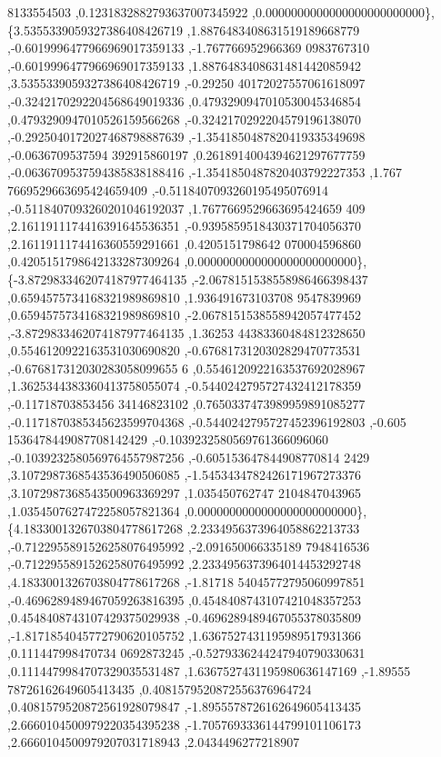 \begin{DoxyCode}
      8133554503 ,0.1231832882793637007345922 ,0.0000000000000000000000000\},
\{3.5355339059327386408426719 ,1.8876483408631519189668779 ,-0.6019996477966969017359133 ,-1.767766952966369
      0983767310 ,-0.6019996477966969017359133 ,1.8876483408631481442085942 ,3.5355339059327386408426719 ,-0.29250
      40172027557061618097 ,-0.3242170292204568649019336 ,0.4793290947010530045346854 ,0.4793290947010526159566268
       ,-0.3242170292204579196138070 ,-0.2925040172027468798887639 ,-1.3541850487820419335349698 ,-0.0636709537594
      392915860197 ,0.2618914004394621297677759 ,-0.0636709537594385838188416 ,-1.3541850487820403792227353 ,1.767
      7669529663695424659409 ,-0.5118407093260195495076914 ,-0.5118407093260201046192037 ,1.7677669529663695424659
      409 ,2.1611911174416391645536351 ,-0.9395859518430371704056370 ,2.1611911174416360559291661 ,0.4205151798642
      070004596860 ,0.4205151798642133287309264 ,0.0000000000000000000000000\},
\{-3.8729833462074187977464135 ,-2.0678151538558986466398437 ,0.6594575734168321989869810 ,1.936491673103708
      9547839969 ,0.6594575734168321989869810 ,-2.0678151538558942057477452 ,-3.8729833462074187977464135 ,1.36253
      44383360484812328650 ,0.5546120922163531030690820 ,-0.6768173120302829470773531 ,-0.676817312030283058099655
      6 ,0.5546120922163537692028967 ,1.3625344383360413758055074 ,-0.5440242795727432412178359 ,-0.11718703853456
      34146823102 ,0.7650337473989959891085277 ,-0.1171870385345623599704368 ,-0.5440242795727452396192803 ,-0.605
      1536478449087708142429 ,-0.1039232580569761366096060 ,-0.1039232580569764557987256 ,-0.605153647844908770814
      2429 ,3.1072987368543536490506085 ,-1.5453434782426171967273376 ,3.1072987368543500963369297 ,1.035450762747
      2104847043965 ,1.0354507627472258057821364 ,0.0000000000000000000000000\},
\{4.1833001326703804778617268 ,2.2334956373964058862213733 ,-0.7122955891526258076495992 ,-2.091650066335189
      7948416536 ,-0.7122955891526258076495992 ,2.2334956373964014453292748 ,4.1833001326703804778617268 ,-1.81718
      54045772795060997851 ,-0.4696289489467059263816395 ,0.4548408743107421048357253 ,0.4548408743107429375029938
       ,-0.4696289489467055378035809 ,-1.8171854045772790620105752 ,1.6367527431195989517931366 ,0.111447998470734
      0692873245 ,-0.5279336244247940790330631 ,0.1114479984707329035531487 ,1.6367527431195980636147169 ,-1.89555
      78726162649605413435 ,0.4081579520872556376964724 ,0.4081579520872561928079847 ,-1.8955578726162649605413435
       ,2.6660104500979220354395238 ,-1.7057693336144799101106173 ,2.6660104500979207031718943 ,2.0434496277218907

\end{DoxyCode}
